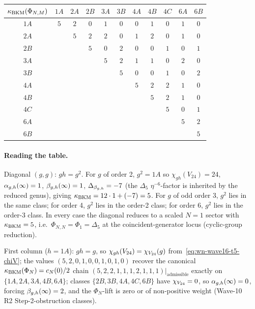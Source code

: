 \begin{center}\footnotesize
\renewcommand{\arraystretch}{1.05}
\begin{tabular}{c|cccccccccc}
$\kappa_{\mathrm{BKM}}(\Phi_{N,M})$ & $1A$ & $2A$ & $2B$ & $3A$ & $3B$ & $4A$ & $4B$ & $4C$ & $6A$ & $6B$ \\
\midrule
$1A$ & $5$ & $2$ & $0$ & $1$ & $0$ & $0$ & $1$ & $0$ & $1$ & $0$ \\
$2A$ &    & $5$ & $2$ & $2$ & $0$ & $1$ & $2$ & $0$ & $1$ & $0$ \\
$2B$ &    &    & $5$ & $0$ & $2$ & $0$ & $0$ & $1$ & $0$ & $1$ \\
$3A$ &    &    &    & $5$ & $2$ & $1$ & $1$ & $0$ & $2$ & $0$ \\
$3B$ &    &    &    &    & $5$ & $0$ & $0$ & $1$ & $0$ & $2$ \\
$4A$ &    &    &    &    &    & $5$ & $2$ & $2$ & $1$ & $0$ \\
$4B$ &    &    &    &    &    &    & $5$ & $2$ & $1$ & $0$ \\
$4C$ &    &    &    &    &    &    &    & $5$ & $0$ & $1$ \\
$6A$ &    &    &    &    &    &    &    &    & $5$ & $2$ \\
$6B$ &    &    &    &    &    &    &    &    &    & $5$ \\
\end{tabular}
\end{center}

\paragraph{Reading the table.}
Diagonal $(g,g)$: $gh = g^2$. For $g$ of order 2, $g^2 = 1A$ so
$\chi_{gh}(V_{24}) = 24$, $\alpha_{g,h}(\infty) = 1$, $\beta_{g,h}(\infty) = 1$,
$\Delta_{\beta_{g,h}} = -7$ (the $\Delta_5$ $\eta^{-6}$-factor is inherited
by the reduced genus), giving $\kappa_{\mathrm{BKM}} = 12 \cdot 1 + (-7) = 5$. For
$g$ of odd order 3, $g^2$ lies in the same class; for order 4,
$g^2$ lies in the order-2 class; for order 6, $g^2$ lies in the
order-3 class. In every case the diagonal reduces to a scaled $N=1$
sector with $\kappa_{\mathrm{BKM}} = 5$, i.e.\ $\Phi_{N,N} = \Phi_1 = \Delta_5$
at the coincident-generator locus (cyclic-group reduction).

First column ($h = 1A$): $gh = g$, so $\chi_{gh}(V_{24}) = \chi_{V_{24}}(g)$
from~\eqref{eq:wn-wave16-t5-chiV}; the values $(5,2,0,1,0,0,1,0,1,0)$
recover the canonical $\kappa_{\mathrm{BKM}}(\Phi_N) = c_N(0)/2$ chain
$(5, 2, 2, 1, 1, 1, 2, 1, 1, 1)|_{\text{admissible}}$ exactly on
$\{1A, 2A, 3A, 4B, 6A\}$; classes $\{2B, 3B, 4A, 4C, 6B\}$ have
$\chi_{V_{24}} = 0$, so $\alpha_{g,h}(\infty) = 0$, forcing $\beta_{g,h}(\infty) = 2$, and
the $\Phi_N$-lift is zero or of non-positive weight (Wave-10 R2
Step-2-obstruction classes).

